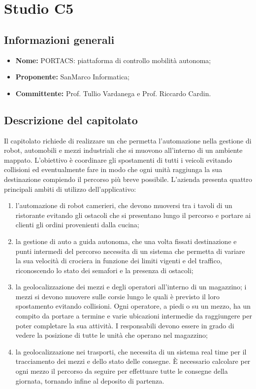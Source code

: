 \section{Studio C5}
\subsection{Informazioni generali}
\begin{itemize}
    \item \textbf{Nome:} PORTACS: piattaforma di controllo mobilità autonoma;
    \item \textbf{Proponente:} SanMarco Informatica;
    \item \textbf{Committente:} Prof. Tullio Vardanega e Prof. Riccardo Cardin.
\end{itemize}

\subsection{Descrizione del capitolato}
Il capitolato richiede di realizzare un  che permetta l’automazione nella gestione di robot, automobili e mezzi industriali che si muovono all’interno di un ambiente mappato. L’obiettivo è coordinare gli spostamenti di tutti i veicoli evitando collisioni ed eventualmente fare in modo che ogni unità raggiunga la sua destinazione compiendo il percorso più breve possibile.
L’azienda presenta quattro principali ambiti di utilizzo dell’applicativo:
\begin{enumerate}
    \item l’automazione di robot camerieri, che devono muoversi tra i tavoli di un ristorante evitando gli ostacoli che si presentano lungo il percorso e portare ai clienti gli ordini provenienti dalla cucina;
    \item la gestione di auto a guida autonoma, che una volta fissati destinazione e punti intermedi del percorso necessita di un sistema che permetta di variare la sua velocità di crociera in funzione dei limiti vigenti e del traffico, riconoscendo lo stato dei semafori e la presenza di ostacoli;
    \item la geolocalizzazione dei mezzi e degli operatori all’interno di un magazzino; i mezzi si devono muovere sulle corsie lungo le quali è previsto il loro spostamento evitando collisioni. Ogni operatore, a piedi o su un mezzo, ha un compito da portare a termine e varie ubicazioni intermedie da raggiungere per poter completare la sua attività. I responsabili devono essere in grado di vedere la posizione di tutte le unità che operano nel magazzino;
    \item la geolocalizzazione nei trasporti, che necessita di un sistema real time per il tracciamento dei mezzi e dello stato delle consegne. È necessario calcolare per ogni mezzo il percorso da seguire per effettuare tutte le consegne della giornata, tornando infine al deposito di partenza.
\end{enumerate}

